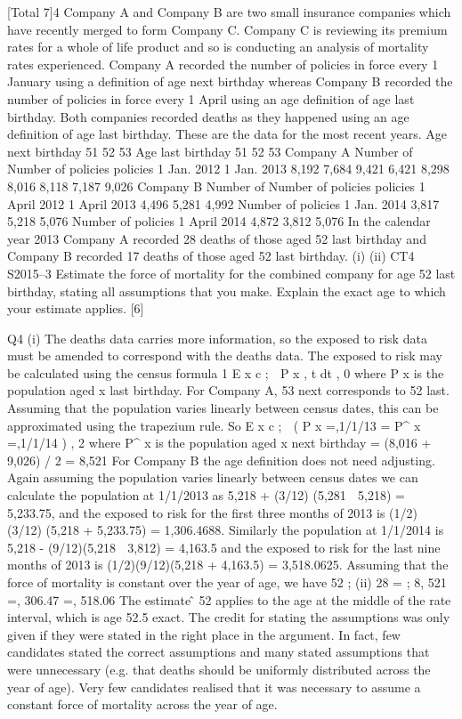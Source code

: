 [Total 7]4
Company A and Company B are two small insurance companies which have recently
merged to form Company C. Company C is reviewing its premium rates for a whole
of life product and so is conducting an analysis of mortality rates experienced.
Company A recorded the number of policies in force every 1 January using a
definition of age next birthday whereas Company B recorded the number of policies
in force every 1 April using an age definition of age last birthday. Both companies
recorded deaths as they happened using an age definition of age last birthday.
These are the data for the most recent years.
Age next
birthday
51
52
53
Age last
birthday
51
52
53
Company A
Number of
Number of
policies
policies
1 Jan. 2012
1 Jan. 2013
8,192
7,684
9,421
6,421
8,298
8,016
8,118
7,187
9,026
Company B
Number of
Number of
policies
policies
1 April 2012
1 April 2013
4,496
5,281
4,992
Number of
policies
1 Jan. 2014
3,817
5,218
5,076
Number of
policies
1 April 2014
4,872
3,812
5,076
In the calendar year 2013 Company A recorded 28 deaths of those aged 52 last
birthday and Company B recorded 17 deaths of those aged 52 last birthday.
(i)
(ii)
CT4 S2015–3
Estimate the force of mortality for the combined company for age 52 last
birthday, stating all assumptions that you make.
Explain the exact age to which your estimate applies.
[6]

\newpage

Q4
(i)
The deaths data carries more information, so the exposed to risk data must be
amended to correspond with the deaths data.
The exposed to risk may be calculated using the census formula
1
E x c ;\+\;  P x , t dt ,
0
where P x is the population aged x last birthday.
For Company A, 53 next corresponds to 52 last.
Assuming that the population varies linearly between census dates, this can be
approximated using the trapezium rule.
So E x c ;\+ 
( P x \;=,1/1/13 \;=\; P^{\ast} x \;=,1/1/14 ) ,
2
where P^{\ast} x is the population aged x next birthday
= (8,016 + 9,026) / 2
= 8,521
For Company B the age definition does not need adjusting.
Again assuming the population varies linearly between census dates we can
calculate the population at 1/1/2013 as
5,218 + (3/12) (5,281  5,218) = 5,233.75,
and the exposed to risk for the first three months of 2013 is
(1/2) (3/12) (5,218 + 5,233.75) = 1,306.4688.
Similarly the population at 1/1/2014 is
5,218 - (9/12)(5,218  3,812) = 4,163.5
and the exposed to risk for the last nine months of 2013 is
(1/2)(9/12)(5,218 + 4,163.5) = 3,518.0625.
Assuming that the force of mortality is constant over the year of age,
we have \hat{\mu} 52 ;\+\;
(ii)
28 \;=
;\+
8, 521 \;=, 306.47 \;=, 518.06
The estimate \mû 52 applies to the age at the middle of the rate interval, which is
age 52.5 exact.
The credit for stating the assumptions was only given if they were stated in
the right place in the argument. In fact, few candidates stated the correct
assumptions and many stated assumptions that were unnecessary (e.g. that
deaths should be uniformly distributed across the year of age). Very few
candidates realised that it was necessary to assume a constant force of
mortality across the year of age.
